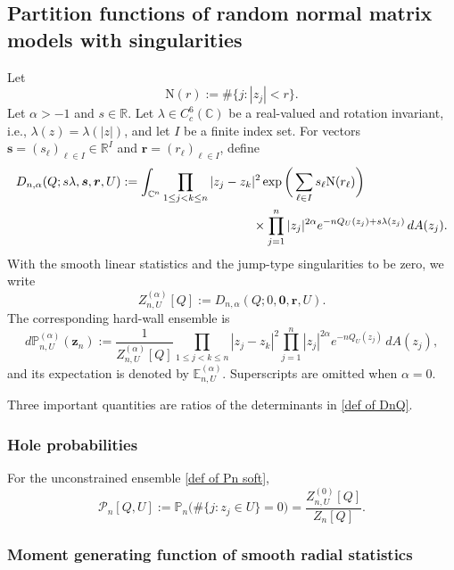\documentclass[a4paper]{article}
\newcommand{\C}{\mathbb{C}}
\newcommand{\R}{\mathbb{R}}
\numberwithin{equation}{section}
\begin{document}
\subsection{Partition functions of random normal matrix models with singularities}

Let
\[
\mathrm N(r):=\#\{j:|z_j|<r\}.
\]
Let $\alpha>-1$ and $s\in\R$. 
Let $\lambda\in C_c^6(\C)$ be a real-valued and rotation invariant, i.e., $\lambda(z)=\lambda(|z|)$, and let $I$ be a finite index set.  For vectors
$\boldsymbol s=(s_\ell)_{\ell\in I}\in\R^I$ and
$\boldsymbol r=(r_\ell)_{\ell\in I}$, define
\begin{align}
\label{def of DnQ}
D_{n,\alpha}(Q;s\lambda,\boldsymbol s,\boldsymbol r,U)
&:=
\int_{\C^n}
\prod_{1\leq j<k\leq n}|z_j-z_k|^2
\exp\bigg(\sum_{\ell\in I}s_\ell\mathrm N(r_\ell)\bigg)
\nonumber\\
&\hspace{3.7cm}\times
\prod_{j=1}^n |z_j|^{2\alpha}
e^{-nQ_U(z_j)+s\lambda(z_j)}\,dA(z_j).
\end{align}
With the smooth linear statistics and the jump-type singularities to be zero, we write
\[
Z_{n,U}^{(\alpha)}[Q]:=D_{n,\alpha}(Q;0,\boldsymbol 0,\boldsymbol r,U).
\]
The corresponding hard-wall ensemble is
\begin{equation}
\label{def of PnU}
d\mathbb P_{n,U}^{(\alpha)}(\boldsymbol z_n)
:=
\frac{1}{Z_{n,U}^{(\alpha)}[Q]}
\prod_{1\leq j<k\leq n}|z_j-z_k|^2
\prod_{j=1}^n|z_j|^{2\alpha}e^{-nQ_U(z_j)}\,dA(z_j),
\end{equation}
and its expectation is denoted by $\mathbb E_{n,U}^{(\alpha)}$.  Superscripts are omitted when $\alpha=0$.

Three important quantities are ratios of the determinants in \eqref{def of DnQ}.

\subsubsection*{Hole probabilities}

For the unconstrained ensemble \eqref{def of Pn soft},
\begin{equation}
\label{def of hole probability U}
\mathcal P_n[Q,U]
:=\mathbb P_n\bigl(\#\{j:z_j\in U\}=0\bigr)
=\frac{Z_{n,U}^{(0)}[Q]}{Z_n[Q]}.
\end{equation}


\subsubsection*{Moment generating function of smooth radial statistics}
\end{document}
